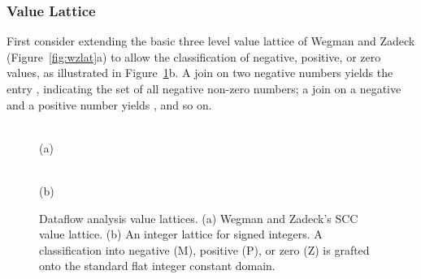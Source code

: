 \documentclass[oribibl]{llncs}
\newcommand{\figscale}{1.0}
\begin{document}
\subsubsection{Value Lattice}
First consider extending the basic three level value lattice of Wegman and
Zadeck (Figure~\ref{fig:wzlat}a) to allow the classification of
negative, positive, or zero
values, as illustrated in Figure~\ref{fig:scclat6}b.
A join on two negative numbers yields the entry ,
indicating the set of all negative non-zero numbers; a
join on a negative and a positive number yields , and so on.
\begin{figure}[tp]%
\begin{center}%
\parbox[b]{6cm}{\centering%
\renewcommand{\figscale}{0.4}\\[.3cm]
(a)}%
\parbox[b]{6cm}{\centering%
\renewcommand{\color}[2][rgb]{}%
\renewcommand{\figscale}{0.4}\\
(b)}%
\end{center}
\caption{Dataflow analysis value lattices.
(a) Wegman and Zadeck's SCC value lattice.
(b) An integer lattice for signed integers.
A classification into
negative (M), positive (P), or zero (Z) is grafted onto the standard
flat integer constant domain.}
\label{fig:wzlat}\label{fig:scclat6}
\end{figure}
\end{document}
